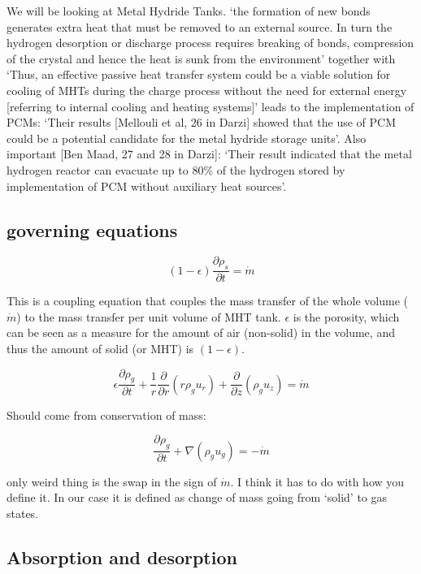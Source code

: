 \documentclass{article}
\begin{document}
We will be looking at Metal Hydride Tanks. `the formation of new bonds generates extra heat that must be removed to an external source. In turn the hydrogen desorption or discharge process requires breaking of bonds, compression of the crystal and hence the heat is sunk from the environment' together with `Thus, an effective passive heat transfer system could be a viable solution for cooling of MHTs during the charge process without the need for external energy [referring to internal cooling and heating systems]' leads to the implementation of PCMs: `Their results [Mellouli et al, 26 in Darzi] showed that the use of PCM could be a potential candidate for the metal hydride storage units'. Also important [Ben Maad, 27 and 28 in Darzi]: `Their result indicated that the metal hydrogen reactor can evacuate up to $80\%$ of the hydrogen stored by implementation of PCM without auxiliary heat sources'.

\subsection*{governing equations}

\begin{equation}
    (1-\epsilon )\frac{\partial \rho_s}{\partial t}=\dot m
\end{equation}

This is a coupling equation that couples the mass transfer of the whole volume ($\dot m$) to the mass transfer per unit volume of MHT tank. $\epsilon$ is the porosity, which can be seen as a measure for the amount of air (non-solid) in the volume, and thus the amount of solid (or MHT) is $(1-\epsilon)$.

\begin{equation}
    \epsilon \frac{\partial\rho_g}{\partial t}+\frac{1}{r}\frac{\partial}{\partial r}\left( r\rho_gu_r\right)+\frac{\partial}{\partial z}\left(\rho_g u_z\right) = \dot m
\end{equation}

Should come from conservation of mass:

\begin{equation}
    \frac{\partial \rho_g}{\partial t}+\nabla (\rho_g u_g) = -\dot m
\end{equation}

only weird thing is the swap in the sign of $\dot m$. I think it has to do with how you define it. In our case it is defined as change of mass going from `solid' to gas states. 

\subsection*{Absorption and desorption}
\end{document}
